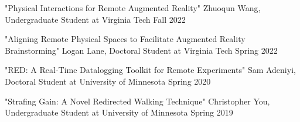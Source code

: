 
\begin{cventries}

  \cventry
    {"Physical Interactions for Remote Augmented Reality"} %
    {Zhuoqun Wang, Undergraduate Student at Virginia Tech} %
    {Fall 2022} %
    {} %
    {}
    \vspace{-0.15in}

  \cventry
    {"Aligning Remote Physical Spaces to Facilitate Augmented Reality Brainstorming"} %
    {Logan Lane, Doctoral Student at Virginia Tech} %
    {Spring 2022} %
    {} %
    {}
    \vspace{-0.15in}
    
  \cventry
    {"RED: A Real-Time Datalogging Toolkit for Remote Experiments"} %
    {Sam Adeniyi, Doctoral Student at University of Minnesota} %
    {Spring 2020} %
    {} %
    {}
    \vspace{-0.15in}
    
  \cventry
    {"Strafing Gain: A Novel Redirected Walking Technique"} %
    {Christopher You, Undergraduate Student at University of Minnesota} %
    {Spring 2019} %
    {} %
    {}
    \vspace{-0.15in}
    
\end{cventries}
